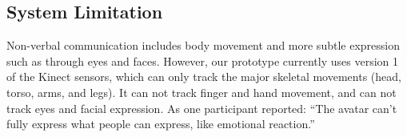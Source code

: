 \subsection{System Limitation}
Non-verbal communication includes body movement and more subtle expression such as through eyes and faces. However, our prototype currently uses version 1 of the Kinect sensors, which can only track the major skeletal movements (head, torso, arms, and legs). It can not track finger and hand movement, and can not track eyes and facial expression. As one participant reported: ``The avatar can't fully express what people can express, like emotional reaction.''






